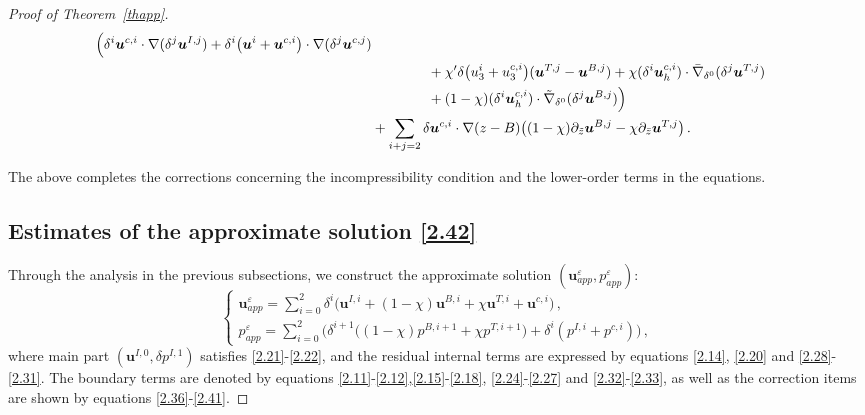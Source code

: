 \documentclass[pdflatex,sn-mathphys-num]{sn-jnl}%
\theoremstyle{thmstyleone}%
\theoremstyle{thmstyletwo}%
\theoremstyle{thmstylethree}%
\theoremstyle{thmstyletwo}
\begin{document}
\begin{proof}[Proof of Theorem~{\upshape\ref{thapp}}]
\begin{align}
	\Big(
	\delta^i\boldsymbol{u}^{c,i}\cdot\nabla (\delta^j\boldsymbol{u}^{I,j})
	+\delta^i\big(\boldsymbol{u}^{i}+\boldsymbol{u}^{c,i}\big)\cdot\nabla(\delta^j\boldsymbol{u}^{c,j})\notag\\
	&\qquad\qquad+\chi'\delta\big({u}_3^{i}+{u}_3^{c,i}\big)(\boldsymbol{u}^{T,j}-\boldsymbol{u}^{B,j})+\chi(\delta^i\boldsymbol{u}_h^{c,i})\cdot\bar{\nabla}_{\delta^0}(\delta^j\boldsymbol{u}^{T,j})
	\notag\\
	&\qquad\qquad+(1-\chi)(\delta^i\boldsymbol{u}_h^{c,i})\cdot\tilde{\nabla}_{\delta^0}(\delta^j\boldsymbol{u}^{B,j})
	\Big)
	\notag\\
	&+\sum_{i+j=2}\delta\boldsymbol{u}^{c,i}
	\cdot\nabla(z-B)\big(
	(1-\chi)\partial_{\tilde{z}}\boldsymbol{u}^{B,j}-\chi\partial_{\bar{z}}\boldsymbol{u}^{T,j}\big)\,.\label{2.41}
\end{align}


The above completes the corrections concerning the incompressibility condition and the lower-order terms in the equations.



\subsection{Estimates of the approximate solution \eqref{2.42}}

Through the analysis in the previous subsections, we construct the approximate solution $(\boldsymbol{u}^\varepsilon_{app},p^\varepsilon_{app})$:
\begin{equation}\label{2.42}
	\begin{cases}
		\boldsymbol{u}_{app}^{\varepsilon}=
		\sum\limits_{i=0}^{2}
		{\delta}^i\big(
		\boldsymbol{u}^{I,i}
		+
		(1-\chi)\boldsymbol u^{B,i}
		+\chi\boldsymbol u^{T,i}
		+\boldsymbol u^{c,i}\big)\,,\\
		p_{app}^{\varepsilon}=
		\sum\limits_{i=0}^{2}
		\Big(
		{\delta}^{i+1}\big(
		(1-\chi)p^{B,i+1}+\chi p^{T,i+1}
		\big)
		+\delta^i(p^{I,i}+p^{c,i})\Big)\,,
	\end{cases}
\end{equation}
where main part $(\boldsymbol{u}^{I,0},\delta p^{I,1})$ satisfies \eqref{2.21}-\eqref{2.22}, and the residual internal terms are expressed by equations \eqref{2.14}, \eqref{2.20} and \eqref{2.28}-\eqref{2.31}.
The boundary terms are denoted by equations \eqref{2.11}-\eqref{2.12},\eqref{2.15}-\eqref{2.18}, \eqref{2.24}-\eqref{2.27} and \eqref{2.32}-\eqref{2.33}, as well as the correction items are shown by equations \eqref{2.36}-\eqref{2.41}.




\end{proof}
\end{document}
